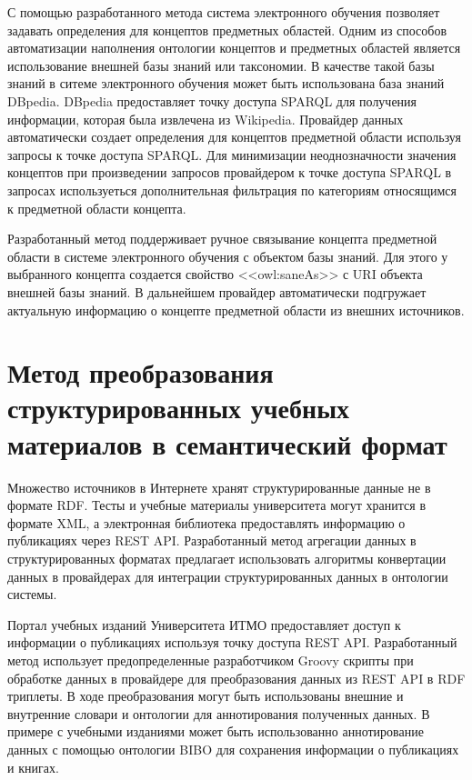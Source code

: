 С помощью разработанного метода система электронного обучения позволяет задавать определения для концептов предметных областей. Одним из способов автоматизации наполнения онтологии концептов и предметных областей является использование внешней базы знаний или таксономии. В качестве такой базы знаний в ситеме электронного обучения может быть использована база знаний DBpedia. DBpedia предоставляет точку доступа SPARQL для получения информации, которая была извлечена из Wikipedia. Провайдер данных автоматически создает определения для концептов предметной области используя запросы к точке доступа SPARQL. Для минимизации неоднозначности значения концептов при произведении запросов провайдером к точке доступа SPARQL в запросах используеться дополнительная фильтрация по категориям относящимся к предметной области концепта. 

Разработанный метод поддерживает ручное связывание концепта предметной области в системе электронного обучения с объектом базы знаний. Для этого у выбранного концепта создается свойство <<owl:saneAs>> с URI объекта внешней базы знаний. В дальнейшем провайдер автоматически подгружает актуальную информацию о концепте предметной области из внешних источников.


\section{Метод преобразования структурированных учебных материалов в семантический формат} \label{sect3_2}

Множество источников в Интернете хранят структурированные данные не в формате RDF. Тесты и учебные материалы университета могут хранится в формате XML, а электронная библиотека предоставлять информацию о публикациях через REST API. Разработанный метод агрегации данных в структурированных форматах предлагает использовать алгоритмы конвертации данных в провайдерах для интеграции структурированных данных в онтологии системы.

Портал учебных изданий Университета ИТМО предоставляет доступ к информации о публикациях используя точку доступа REST API. Разработанный метод использует предопределенные разработчиком Groovy скрипты при обработке данных в провайдере для преобразования данных из REST API в RDF триплеты. В ходе преобразования могут быть использованы внешние и внутренние словари и онтологии для аннотирования полученных данных. В примере с учебными изданиями может быть использованно аннотирование данных с помощью онтологии BIBO для сохранения информации о публикациях и книгах. 

